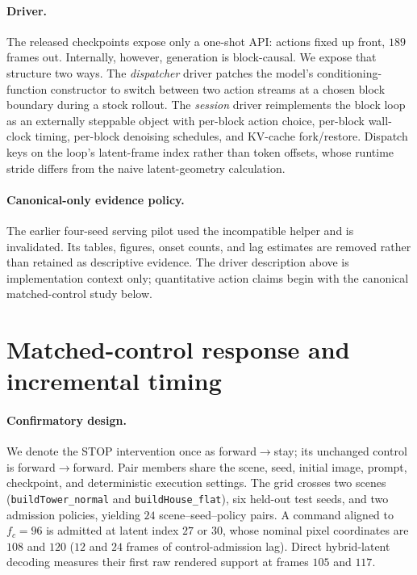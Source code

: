 \documentclass[11pt]{article}
\begin{document}
\paragraph{Driver.}
The released checkpoints expose only a one-shot API: actions fixed up front, $189$ frames out. Internally, however, generation is block-causal. We expose that structure two ways. The \emph{dispatcher} driver patches the model's conditioning-function constructor to switch between two action streams at a chosen block boundary during a stock rollout. The \emph{session} driver reimplements the block loop as an externally steppable object with per-block action choice, per-block wall-clock timing, per-block denoising schedules, and KV-cache fork/restore. Dispatch keys on the loop's latent-frame index rather than token offsets, whose runtime stride differs from the naive latent-geometry calculation.

\paragraph{Canonical-only evidence policy.}
The earlier four-seed serving pilot used the incompatible helper and is
invalidated. Its tables, figures, onset counts, and lag estimates are removed
rather than retained as descriptive evidence. The driver description above is
implementation context only; quantitative action claims begin with the
canonical matched-control study below.

\section{Matched-control response and incremental timing}
\label{sec:causal}

\paragraph{Confirmatory design.}
We denote the STOP intervention once as forward$\to$stay; its unchanged control is forward$\to$forward. Pair members share the scene, seed, initial image, prompt, checkpoint, and deterministic execution settings. The grid crosses two scenes (\texttt{buildTower\_normal} and \texttt{buildHouse\_flat}), six held-out test seeds, and two admission policies, yielding $24$ scene--seed--policy pairs. A command aligned to $f_c=96$ is admitted at latent index $27$ or $30$, whose nominal pixel coordinates are $108$ and $120$ ($12$ and $24$ frames of control-admission lag). Direct hybrid-latent decoding measures their first raw rendered support at frames $105$ and $117$.
\end{document}
